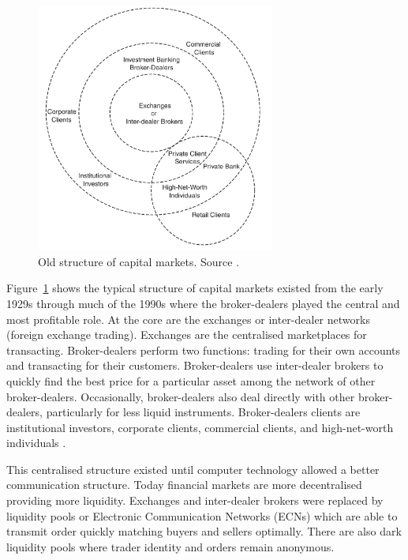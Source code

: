 \begin{figure}[!h]
  \centering
  \includegraphics[width=0.7\textwidth]{img/capitalmarkets}
  \caption[Old structure of capital markets]{Old structure of capital markets. Source \cite{aldridge2009}.}
  \label{fig:capitalmarket}
\end{figure}
Figure~\ref{fig:capitalmarket} shows the typical structure of capital markets
existed from the early 1929s through much of the 1990s where the broker-dealers
played the central and most profitable role.  At the core are the exchanges or
inter-dealer networks (foreign exchange trading). Exchanges are the centralised
marketplaces for transacting.  Broker-dealers perform two functions: trading for
their own accounts and transacting for their customers. Broker-dealers use
inter-dealer brokers to quickly find the best price for a particular asset among
the network of other broker-dealers. Occasionally, broker-dealers also deal
directly with other broker-dealers, particularly for less liquid instruments.
Broker-dealers clients are institutional investors, corporate clients,
commercial clients, and high-net-worth individuals \cite{aldridge2009}.

This centralised structure existed until computer technology allowed a better
communication structure. Today financial markets are more decentralised
providing more liquidity. Exchanges and inter-dealer brokers were replaced by
liquidity pools or Electronic Communication Networks (ECNs) which are able to
transmit order quickly matching buyers and sellers optimally. There are also
dark liquidity pools where trader identity and orders remain anonymous.

